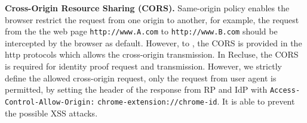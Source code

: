 \noindent\textbf{Cross-Origin Resource Sharing (CORS).} Same-origin policy enables the browser restrict the request from one origin to another, for example, the request from the the web page \verb+http://www.A.com+ to \verb+http://www.B.com+ should be intercepted by the browser as default. However, to , the CORS is provided in the http protocols which allows the cross-origin transmission. In Recluse, the CORS is required for identity proof request and transmission. However, we strictly define the allowed cross-origin request, only the request from user agent is permitted, by setting the header of the response from RP and IdP with \verb+Access-Control-Allow-Origin:+ \verb+chrome-extension://chrome-id+. It is able to prevent the possible {XSS} attacks.



